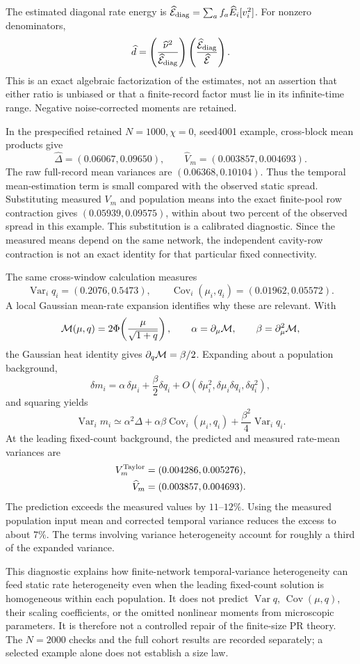 The estimated diagonal rate energy is
\(\widehat{\mathcal E}_{\rm diag}=\sum_a f_a\widehat E_i[v_i^2]\).
For nonzero denominators,
\[
 \widehat d=
 \left(\frac{\widehat\nu^2}{\widehat{\mathcal E}_{\rm diag}}\right)
 \left(\frac{\widehat{\mathcal E}_{\rm diag}}
             {\widehat{\mathcal E}}\right).
\]
This is an exact algebraic factorization of the estimates, not an assertion
that either ratio is unbiased or that a finite-record factor must lie in
its infinite-time range. Negative noise-corrected moments are retained.

In the prespecified retained \(N=1000,\chi=0\), seed4001 example, cross-block
mean products give
\[
 \widehat\Delta=(0.06067,0.09650),\qquad
 \widehat V_m=(0.003857,0.004693).
\]
The raw full-record mean variances are \((0.06368,0.10104)\).
Thus the temporal mean-estimation term is small compared with the observed
static spread. Substituting measured \(V_m\) and population means into the
exact finite-pool row contraction gives \((0.05939,0.09575)\), within about
two percent of the observed spread in this example. This substitution is
a calibrated diagnostic. Since the measured means depend on the same
network, the independent cavity-row contraction is not an exact identity
for that particular fixed connectivity.

The same cross-window calculation measures
\[
 \operatorname{Var}_i q_i=(0.2076,0.5473),\qquad
 \operatorname{Cov}_i(\mu_i,q_i)=(0.01962,0.05572).
\]
A local Gaussian mean-rate expansion identifies why these are relevant.
With
\[
 {\cal M}(\mu,q)=2\Phi\!\left(\frac{\mu}{\sqrt{1+q}}\right),
 \qquad
 \alpha=\partial_\mu{\cal M},\qquad
 \beta=\partial_\mu^2{\cal M},
\]
the Gaussian heat identity gives \(\partial_q{\cal M}=\beta/2\).
Expanding about a population background,
\[
 \delta m_i=\alpha\,\delta\mu_i+\frac{\beta}{2}\delta q_i+
             O(\delta\mu_i^2,\delta\mu_i\delta q_i,\delta q_i^2),
\]
and squaring yields
\[
 \operatorname{Var}_i m_i
 \simeq\alpha^2\Delta+
       \alpha\beta\operatorname{Cov}_i(\mu_i,q_i)+
       \frac{\beta^2}{4}\operatorname{Var}_i q_i.
\]
At the leading fixed-count background, the predicted and measured rate-mean
variances are
\begin{align*}
 V_m^{\rm Taylor}&=(0.004286,0.005276),\\
 \widehat V_m&=(0.003857,0.004693).
\end{align*}
The prediction exceeds the measured values by \(11\)--\(12\%\).
Using the measured population input mean and corrected temporal variance
reduces the excess to about \(7\%\). The terms involving variance
heterogeneity account for roughly a third of the expanded variance.

This diagnostic explains how finite-network temporal-variance heterogeneity
can feed static rate heterogeneity even when the leading fixed-count
solution is homogeneous within each population. It does not predict
\(\operatorname{Var}q\), \(\operatorname{Cov}(\mu,q)\), their scaling
coefficients, or the omitted nonlinear moments from microscopic parameters.
It is therefore not a controlled repair of the finite-size PR theory.
The \(N=2000\) checks and the full cohort results are recorded separately;
a selected example alone does not establish a size law.
